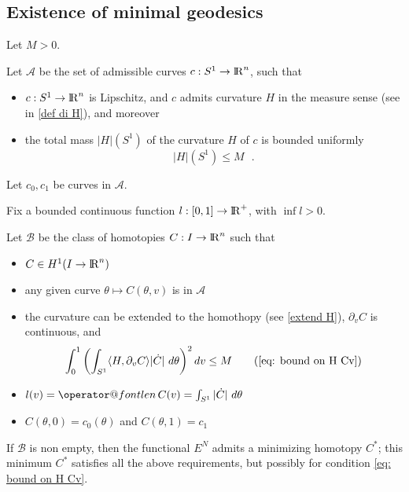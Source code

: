 \documentclass[twoside,a4paper,english]{article}
\makeatletter
\def\derpar#1{\partial_{#1}}
\def\len{\mathop{\operator@font len}\nolimits}
\makeatother
\begin{document}
\endgroup



\subsection{Existence of minimal geodesics}

\begin{Theorem}\label{thm:existence}
  Let $M>0$. 

  Let $\mathcal A$ be the set of admissible curves $c:S^1\to{\protect\mathrm{l\hskip-0.15em R}}^n$, such that
  \begin{itemize}
  \item $c:S^1\to{\protect\mathrm{l\hskip-0.15em R}}^n$ is Lipschitz, and $c$ admits curvature  $H$
    in the measure sense (see in \ref{def di H}), and moreover
  \item the total mass $|H|(S^1)$ of the curvature $H$ of $c$
    is bounded uniformly
    \begin{equation}\label{eq: bound mass H}
       |H|(S^1) \le M ~~~.
    \end{equation}
  \end{itemize}

  Let $c_0,c_1$ be curves in  $\mathcal A$.

  Fix a bounded continuous function $l:[0,1]\to{\protect\mathrm{l\hskip-0.15em R}}^+$, with  $\inf l>0$.

  Let $\mathcal B$ be  the class
  of homotopies $C:I\to {\protect\mathrm{l\hskip-0.15em R}}^n$ such that
  \begin{itemize}
  \item $C\in H^1(I\to{\protect\mathrm{l\hskip-0.15em R}}^n)$
  \item 
    any given curve $\theta\mapsto C(\theta,v)$ is in $\mathcal A$ 
  \item \label{cond compatt}
    the curvature can be extended to the homothopy (see \ref{extend H}),
    $\derpar v C$ is continuous, and
    \[ \int_0^1 \left(  \int_{S^1}
    \langle H, \derpar v C \rangle |\dot C|~d\theta\right)^2 dv   
    \le M   \tag{\eqref{eq: bound on H Cv}}    \]
  \item $l(v)=\len C(v)=\int_{S^1}|\dot C|~d\theta $ 
  \item    $C(\theta,0)=c_0(\theta)$ and $C(\theta,1)=c_1$
  \end{itemize}

  If $\mathcal B$ is non empty, then the functional $E^N$ admits a minimizing
  homotopy $C^*$;
  this minimum $C^*$ satisfies all the above requirements, but possibly for
  condition \eqref{eq: bound on H Cv}.
\end{Theorem}
\end{document}
